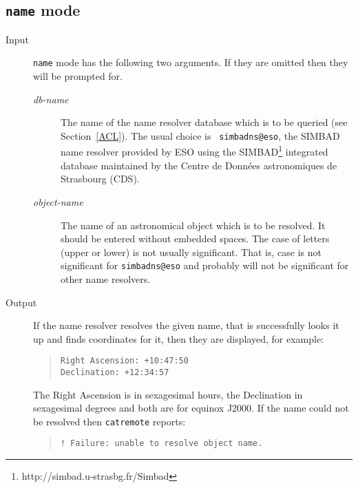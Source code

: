 \documentclass[twoside,11pt]{article}
\newcommand{\htmladdnormallinkfoot}[2]{#1\footnote{#2}}
\newcommand{\htmladdnormallink}[2]{#1}
\renewcommand{\_}{\texttt{\symbol{95}}}
\begin{document}
\subsection{{\tt name} mode}

\begin{description}

  \item[Input] {\tt name} mode has the following two arguments.  If they
   are omitted then they will be prompted for.

  \begin{description}

    \item[{\it db-name}\/] The name of the name resolver database which
     is to be queried (see Section~\ref{ACL}).  The usual choice is {\tt
     simbad\_ns@eso}, the SIMBAD name resolver provided by ESO using the
     \htmladdnormallinkfoot{SIMBAD}{http://simbad.u-strasbg.fr/Simbad}
     integrated database maintained by the
     \htmladdnormallink{Centre de Donn\'{e}es astronomiques de Strasbourg}
     {http://cdsweb.u-strasbg.fr/CDS.html} (CDS).

    \item[{\it object-name}] The name of an astronomical object which is
     to be resolved.  It should be entered without embedded spaces.  The
     case of letters (upper or lower) is not usually significant.  That
     is, case is not significant for {\tt simbad\_ns@eso} and probably
     will not be significant for other name resolvers.

  \end{description}

  \item[Output] If the name resolver resolves the given name, that is
   successfully looks it up and finds coordinates for it, then they are
   displayed, for example:

  \begin{quote}
   \verb=Right Ascension: +10:47:50= \\
   \verb=Declination: +12:34:57=
  \end{quote}

   The Right Ascension is in sexagesimal hours, the Declination in
   sexagesimal degrees and both are for equinox J2000.  If the name
   could not be resolved then {\tt catremote} reports:

  \begin{quote}
   \verb=! Failure: unable to resolve object name.=
  \end{quote}

\end{description}
\end{document}
